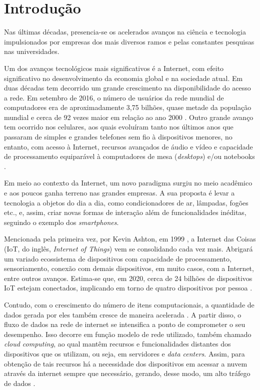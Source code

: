 \chapter{Introdu\c{c}\~{a}o}

Nas últimas décadas, presencia-se os acelerados avanços na ciência e tecnologia impulsionados por empresas dos mais diversos ramos e pelas constantes pesquisas nas universidades.  

Um dos avanços tecnológicos mais significativos é a Internet, com efeito significativo no desenvolvimento da economia global e na sociedade atual. Em duas décadas tem decorrido um grande crescimento na disponibilidade do acesso a rede. Em setembro de 2016, o número de usuários da rede mundial de computadores era de aproximadamente 3,75 bilhões, quase metade da população mundial e cerca de 92 vezes maior em relação ao ano 2000 \cite{MiniwattsMarketingGroup2016}.  Outro grande avanço tem ocorrido nos celulares, aos quais evoluíram tanto nos últimos anos que passaram de simples e grandes telefones sem fio à dispositivos menores, no entanto, com acesso à Internet, recursos avançados de áudio e vídeo e capacidade de processamento equiparável à computadores de mesa (\textit{desktops}) e/ou notebooks \cite{Meyers2011, Woyke2014}.

Em meio ao contexto da Internet, um novo paradigma surgiu no meio acadêmico e aos poucos ganha terreno nas grandes empresas. A sua proposta é levar a tecnologia a objetos do dia a dia, como condicionadores de ar, lâmpadas, fogões etc., e, assim, criar novas formas de interação além de funcionalidades inéditas, seguindo o exemplo dos \textit{smartphones}. 

Mencionada pela primeira vez, por Kevin Ashton, em 1999 \cite{Finep2015}, a Internet das Coisas (IoT, do inglês, \textit{Internet of Things}) vem se consolidando cada vez mais. Abrigará um variado ecossistema de dispositivos com capacidade de processamento, sensoriamento, conexão com demais dispositivos, em muito casos, com a Internet, entre outros avanços. Estima-se que, em 2020, cerca de 24 bilhões de dispositivos IoT estejam conectados, implicando em torno de quatro dispositivos por pessoa \cite{Meola2016}.   

Contudo, com o crescimento do número de itens computacionais, a quantidade de dados gerada por eles também cresce de maneira acelerada \cite{Chiang2016}. A partir disso, o fluxo de dados na rede de internet se intensifica a ponto de comprometer o seu desempenho. Isso decorre em função modelo de rede utilizado, também chamado \textit{cloud computing}, ao qual mantêm recursos e funcionalidades distantes dos dispositivos que os utilizam, ou seja, em servidores e \textit{data centers}. Assim, para obtenção de tais recursos há a necessidade dos dispositivos em acessar a nuvem através da internet sempre que necessário, gerando, desse modo, um alto tráfego de dados \cite{Vaquero2014}. 

